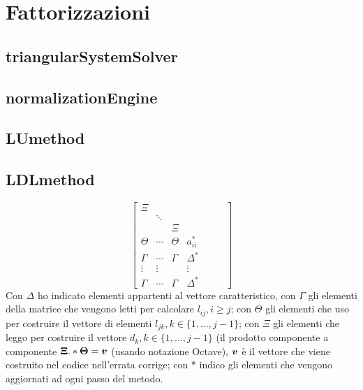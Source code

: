 \section{Fattorizzazioni}
\subsection{triangularSystemSolver}


\subsection{normalizationEngine}


\subsection{LUmethod}
\label{subsection:LUmethod}


\subsection{LDLmethod}
\label{subsection:LDLmethod}
\begin{oss}
\begin{displaymath}
\begin{bmatrix}
\Xi \\
 &  \ddots \\
 & &  \Xi \\
\Theta & \cdots & \Theta & a_{ii}^{*} &  &  &    
	 \\ \Gamma & \cdots & \Gamma & \Delta^{*}
	 \\ \vdots & \vdots &  & \vdots
	 \\ \Gamma & \cdots & \Gamma & \Delta^{*}
\end{bmatrix}
\end{displaymath}
Con $\Delta$ ho indicato elementi appartenti al vettore caratteristico,  con
$\Gamma$ gli elementi della matrice che vengono letti per calcolare $l_{ij}, i
\geq j$; con $\Theta$ gli elementi che uso per costruire il vettore di elementi 
$l_{jk}, k \in \{1, \ldots, j-1 \}$; con $\Xi$ gli elementi che leggo 
per costruire il vettore $d_{k}, k \in \{1, \ldots, j-1 \}$ (il prodotto
componente a componente $\boldsymbol{\Xi}.*\boldsymbol{\Theta} = \boldsymbol{v}$ (usando notazione
Octave), $\boldsymbol{v}$ \`e il vettore che viene costruito nel codice nell'errata
corrige; con * indico gli elementi che vengono aggiornati ad ogni passo del
metodo.
\end{oss}


